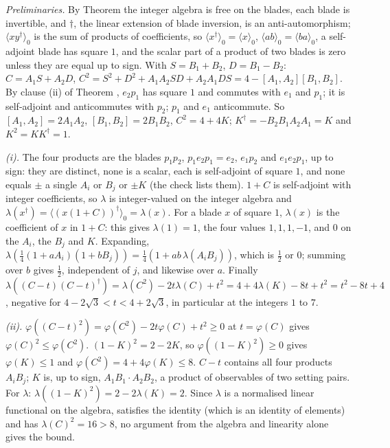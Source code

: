 \emph{Preliminaries.} By Theorem  the integer algebra is free on the blades, each blade is invertible, and $\dagger$, the linear extension of blade inversion, is an anti-automorphism; $\langle xy^{\dagger}\rangle_{0}$ is the sum of products of coefficients, so $\langle x^{\dagger}\rangle_{0} = \langle x\rangle_{0}$, $\langle ab\rangle_{0} = \langle ba\rangle_{0}$, a self-adjoint blade has square $1$, and the scalar part of a product of two blades is zero unless they are equal up to sign. With $S = B_{1} + B_{2}$, $D = B_{1} - B_{2}$: $C = A_{1}S + A_{2}D$, $C^{2} = S^{2} + D^{2} + A_{1}A_{2}SD + A_{2}A_{1}DS = 4 - [A_{1},A_{2}][B_{1},B_{2}]$. By clause (ii) of Theorem , $e_{2}p_{1}$ has square $1$ and commutes with $e_{1}$ and $p_{1}$; it is self-adjoint and anticommutes with $p_{2}$; $p_{1}$ and $e_{1}$ anticommute. So $[A_{1},A_{2}] = 2A_{1}A_{2}$, $[B_{1},B_{2}] = 2B_{1}B_{2}$, $C^{2} = 4 + 4K$; $K^{\dagger} = -B_{2}B_{1}A_{2}A_{1} = K$ and $K^{2} = KK^{\dagger} = 1$.

\emph{(i).} The four products are the blades $p_{1}p_{2}$, $p_{1}e_{2}p_{1} = e_{2}$, $e_{1}p_{2}$ and $e_{1}e_{2}p_{1}$, up to sign: they are distinct, none is a scalar, each is self-adjoint of square $1$, and none equals $\pm$ a single $A_{i}$ or $B_{j}$ or $\pm K$ (the check lists them). $1 + C$ is self-adjoint with integer coefficients, so $\lambda$ is integer-valued on the integer algebra and $\lambda(x^{\dagger}) = \langle(x(1 + C))^{\dagger}\rangle_{0} = \lambda(x)$. For a blade $x$ of square $1$, $\lambda(x)$ is the coefficient of $x$ in $1 + C$: this gives $\lambda(1) = 1$, the four values $1, 1, 1, -1$, and $0$ on the $A_{i}$, the $B_{j}$ and $K$. Expanding, $\lambda(\tfrac14(1 + aA_{i})(1 + bB_{j})) = \tfrac14(1 + ab\,\lambda(A_{i}B_{j}))$, which is $\tfrac12$ or $0$; summing over $b$ gives $\tfrac12$, independent of $j$, and likewise over $a$. Finally $\lambda((C - t)(C - t)^{\dagger}) = \lambda(C^{2}) - 2t\lambda(C) + t^{2} = 4 + 4\lambda(K) - 8t + t^{2} = t^{2} - 8t + 4$, negative for $4 - 2\sqrt{3} < t < 4 + 2\sqrt{3}$, in particular at the integers $1$ to $7$.

\emph{(ii).} $\varphi((C - t)^{2}) = \varphi(C^{2}) - 2t\varphi(C) + t^{2} \ge 0$ at $t = \varphi(C)$ gives $\varphi(C)^{2} \le \varphi(C^{2})$. $(1 - K)^{2} = 2 - 2K$, so $\varphi((1 - K)^{2}) \ge 0$ gives $\varphi(K) \le 1$ and $\varphi(C^{2}) = 4 + 4\varphi(K) \le 8$. $C - t$ contains all four products $A_{i}B_{j}$; $K$ is, up to sign, $A_{1}B_{1}\cdot A_{2}B_{2}$, a product of observables of two setting pairs. For $\lambda$: $\lambda((1 - K)^{2}) = 2 - 2\lambda(K) = 2$. Since $\lambda$ is a normalised linear functional on the algebra, satisfies the identity (which is an identity of elements) and has $\lambda(C)^{2} = 16 > 8$, no argument from the algebra and linearity alone gives the bound.

